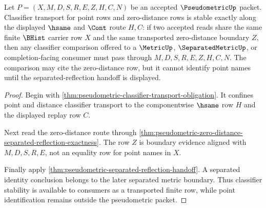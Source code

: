 \begin{theorem}
\label{thm:pseudometric-classifier-stability}
Let $P=(X,M,D,S,R,E,Z,H,C,N)$ be an accepted $\PseudometricUp$ packet. Classifier transport for point rows and zero-distance rows is stable exactly along the displayed $\hsame$ and $\Cont$ route $H,C$: if two accepted reads share the same finite $\BHist$ carrier row $X$ and the same transported zero-distance boundary $Z$, then any classifier comparison offered to a $\MetricUp$, $\SeparatedMetricUp$, or completion-facing consumer must pass through $M,D,S,R,E,Z,H,C,N$. The comparison may cite the zero-distance row, but it cannot identify point names until the separated-reflection handoff is displayed.
\end{theorem}
\begin{proof}
Begin with \autoref{thm:pseudometric-classifier-transport-obligation}. It confines point and distance classifier transport to the componentwise $\hsame$ row $H$ and the displayed replay row $C$.

Next read the zero-distance route through \autoref{thm:pseudometric-zero-distance-separated-reflection-exactness}. The row $Z$ is boundary evidence aligned with $M,D,S,R,E$, not an equality row for point names in $X$.

Finally apply \autoref{thm:pseudometric-separated-reflection-handoff}. A separated identity conclusion belongs to the later separated metric boundary. Thus classifier stability is available to consumers as a transported finite row, while point identification remains outside the pseudometric packet.
\end{proof}

